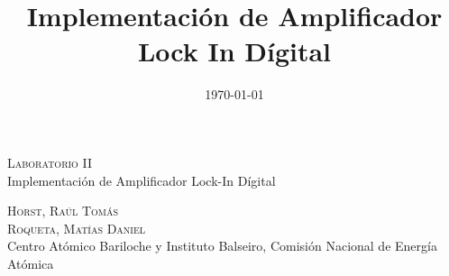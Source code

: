 \documentclass[11pt,a4paper]{extarticle}
\date{\small{\today}}
\begin{document}
\title{Implementación de Amplificador Lock In Dígital}
	\LARGE{\textsc{Laboratorio II}}\\
	\Large{Implementación de Amplificador Lock-In Dígital}\\
\begin{large}
\small\textsc{Horst, Raúl Tomás}\\
\small\textsc{Roqueta, Matías Daniel}\\
\small{Centro Atómico Bariloche y Instituto Balseiro, Comisión Nacional de Energía Atómica}\\
\end{large}
\setcounter{page}{1}

\chead{}

\rfoot{\thepage} 
\renewcommand{\headrulewidth}{0.4pt} 
\renewcommand{\footrulewidth}{0.4pt} 
\pagestyle{fancy}
\end{document}
